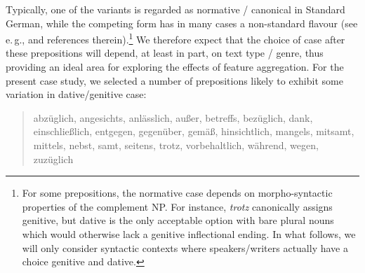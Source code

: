  Typically, one of the variants is regarded as normative / canonical in Standard German, while the competing form has in many cases a non-standard flavour (see e.\,g., \citealp{Dimeola2009} and references therein).\footnote{For some prepositions, the normative case depends on morpho-syntactic properties of the complement NP. For instance, \textit{trotz} canonically assigns genitive, but dative is the only acceptable option with bare plural nouns which would otherwise lack a genitive inflectional ending. In what follows, we will only consider syntactic contexts where speakers/writers actually have a choice genitive and dative.} We therefore expect that the choice of case after these prepositions will depend, at least in part, on text type / genre, thus providing an ideal area for exploring the effects of feature aggregation. For the present case study, we selected a number of prepositions likely to exhibit some variation in dative/genitive case:
 
 \begin{quote} 
   abzüglich, angesichts, anlässlich, au{\ss}er, betreffs, bezüglich, dank, einschlie{\ss}lich, entgegen, gegenüber, gemä{\ss}, hinsichtlich, mangels, mitsamt, mittels, nebst, samt, seitens, trotz, vorbehaltlich, während, wegen, zuzüglich
 \end{quote}



